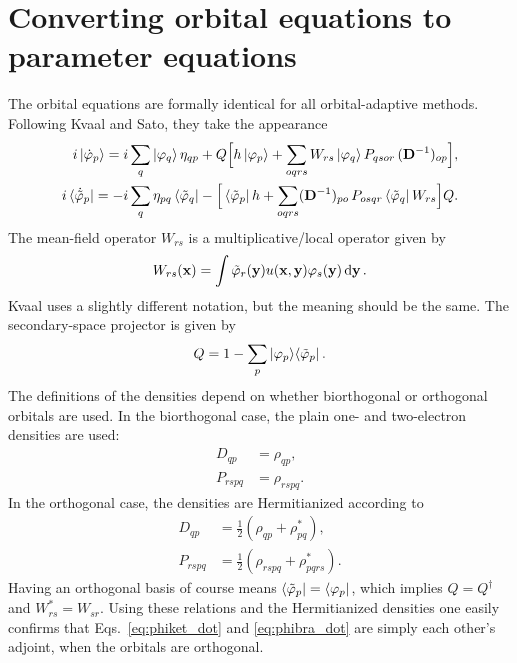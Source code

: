 \documentclass[aip,jcp,preprint,superscriptaddress,nofootinbib]{revtex4-1}
\begin{document}
\section{Converting orbital equations to parameter equations}
The orbital equations are formally identical for all orbital-adaptive methods.
Following Kvaal\cite{kvaalInitioQuantumDynamics2012} and Sato\cite{satoCommunicationTimedependentOptimized2018}, 
they take the appearance
\begin{align}
    i \ket{\dot{\varphi}_{p}} 
    = i \sum_{q} \ket{\varphi_{q}} \eta_{qp}
    + Q \Big[
    h \ket{\varphi_{p}} + \sum_{oqrs} W_{rs} \ket{\varphi_{q}} P_{qsor} \, (\mathbf{D}^{-1})_{op}
    \Big], \label{eq:phiket_dot} \\
    i \bra{\dot{\tilde{\varphi}}_{p}} 
    = -i \sum_{q} \eta_{pq} \bra{\tilde{\varphi}_{q}} -
    \Big[
    \bra{\tilde{\varphi}_{p}} h + \sum_{oqrs} (\mathbf{D}^{-1})_{po} \, P_{osqr}  \bra{\tilde{\varphi}_{q}} W_{rs} 
    \Big] Q. \label{eq:phibra_dot}
\end{align}
The mean-field operator\cite{miyagiTimedependentRestrictedactivespaceSelfconsistentfield2013,satoTimedependentCompleteactivespaceSelfconsistentfield2013}
$W_{rs}$ is a multiplicative/local operator given by
\begin{align}
    W_{rs} (\mathbf{x}) = \int \tilde{\varphi}_{r} (\mathbf{y}) u(\mathbf{x}, \mathbf{y}) \varphi_{s} (\mathbf{y}) \dd{\mathbf{y}}.
\end{align}
Kvaal\cite{kvaalInitioQuantumDynamics2012} uses a slightly different notation, but the meaning should be the same. 
The secondary-space projector is given by
\begin{align}
    Q = 1 - \sum_{p} \ket{\varphi_{p}} \! \bra{\tilde{\varphi}_{p}}.
\end{align}
The definitions of the densities depend on whether biorthogonal\cite{kvaalInitioQuantumDynamics2012}
or orthogonal\cite{satoTimedependentCompleteactivespaceSelfconsistentfield2013} orbitals are used.
In the biorthogonal case, the plain one- and two-electron densities are used:
\begin{align}
    D_{qp}   &= \rho_{qp}, \\
    P_{rspq} &= \rho_{rspq}.
\end{align}
In the orthogonal case, the densities are Hermitianized according to
\begin{align}
    D_{qp}   &= \tfrac{1}{2} ( \rho_{qp}   + \rho_{pq}^*   ), \\
    P_{rspq} &= \tfrac{1}{2} ( \rho_{rspq} + \rho_{pqrs}^* ).
\end{align}
Having an orthogonal basis of course means $\bra{\tilde{\varphi}_{p}} = \bra{\varphi_{p}}$,
which implies $Q = Q^{\dagger}$ and $W_{rs}^* = W_{sr}$. Using these relations
and the Hermitianized densities one easily confirms that Eqs.~\eqref{eq:phiket_dot}
and \eqref{eq:phibra_dot} are simply each other's adjoint,
when the orbitals are orthogonal.
\end{document}
